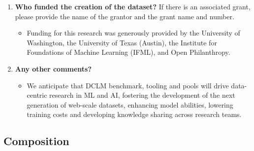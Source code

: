 \documentclass{article}
\newcommand{\dclm}{\textsc{DCLM}\xspace}
\begin{document}
\begin{enumerate}[label=Q\arabic*]
\item \textbf{Who funded the creation of the dataset?} If there is an associated grant, please provide the name of the grantor and the grant name and number.

\begin{itemize}
\item Funding for this research was generously provided by the University of Washington, the University of Texas (Austin), the Institute for Foundations of Machine Learning (IFML), and Open Philanthropy.
\end{itemize}

\item \textbf{Any other comments?}

\begin{itemize}
\item We anticipate that \dclm benchmark, tooling and pools will drive data-centric research in ML and AI, fostering the development of the next generation of web-scale datasets, enhancing model abilities, lowering training costs and developing knowledge sharing across research teams.
\end{itemize}

\end{enumerate}

\subsection{Composition}
\end{document}
